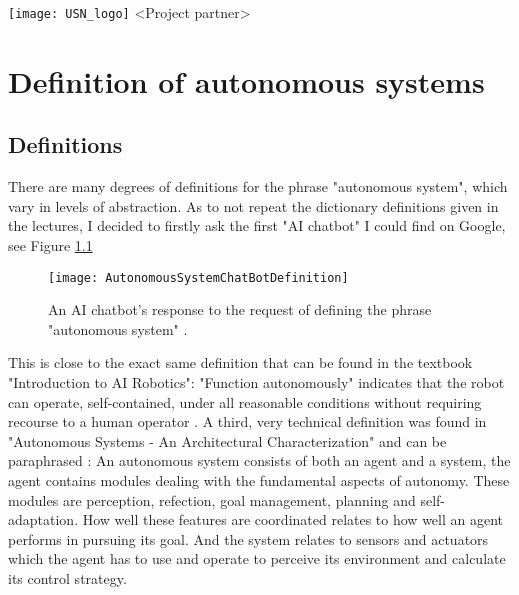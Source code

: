 \documentclass[%
oneside,    %
project,    %
nosummary   %
]{USN-MSc}
\newcommand{\myauthor}{%
223786 Lars Rikard Rådstoga
}
\newcommand{\myparticipants}{
<First participant>\\
<Second participant>\\
<Third participant>\\
<Fourth participant>
}
\begin{document}
\USNtitlepage%
{%
  {}
   \texttt{[image: USN\_logo]}}
{<Project partner>}
{%
\lipsum[6-7]
}





\tableofcontents
{}





\chapter{Definition of autonomous systems}
\label{ch:definition}
\lipsum[4]
\section{Definitions}
There are many degrees of definitions for the phrase "autonomous system", which vary in levels of abstraction. 
As to not repeat the dictionary definitions given in the lectures, I decided to firstly ask the first "AI chatbot" I could find on Google, see Figure \ref{fig:chat-bot}
\begin{figure}[!ht]
  \centering
  \texttt{[image: AutonomousSystemChatBotDefinition]}
  \caption{An AI chatbot's response to the request of defining the phrase "autonomous system" \cite{ChaiChat90:online}.}
  \label{fig:chat-bot}
\end{figure}
This is close to the exact same definition that can be found in the textbook "Introduction to AI Robotics":
"Function autonomously" indicates that the robot can operate, self-contained, under all reasonable conditions without requiring recourse to a human operator \cite{murphy2000introduction}.
A third, very technical definition was found in "Autonomous Systems - An Architectural Characterization" and can be paraphrased \cite{Sifakis}:
An autonomous system consists of both an agent and a system, the agent contains modules dealing with the fundamental aspects of autonomy.
These modules are perception, refection, goal management, planning and self-adaptation. How well these features are coordinated relates to how well an agent performs in pursuing its goal.
And the system relates to sensors and actuators which the agent has to use and operate to perceive its environment and calculate its control strategy.
\end{document}
